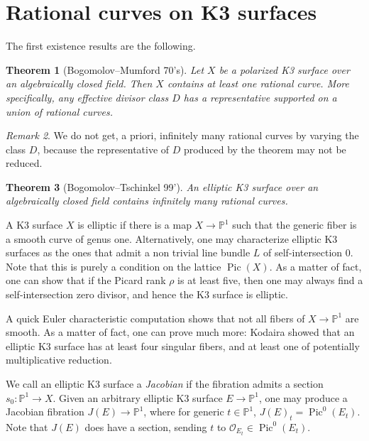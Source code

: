 \documentclass{amsart}
\theoremstyle{plain}
\newtheorem{theorem}{Theorem}[section]
\theoremstyle{definition}
\theoremstyle{remark}
\newtheorem{remark}[theorem]{Remark}
\DeclareMathOperator{\Pic}{Pic}
\begin{document}
\section{Rational curves on K3 surfaces} %
\label{sec:rational_curves_on_k3_surfaces}

The first existence results are the following.
\begin{theorem}[Bogomolov--Mumford 70's]
\label{theorem:bogomolov-mumford}
Let $X$ be a polarized K3 surface over an algebraically closed field.
Then $X$ contains at least one rational curve.
 More specifically, any effective divisor class $D$ has a representative supported on a union of
 rational curves. 
\end{theorem}
\begin{remark}
We do not get, a priori, infinitely many rational curves by varying the class $D$, 
because the representative of $D$ produced by the theorem may not be reduced.
\end{remark}

\begin{theorem}[Bogomolov--Tschinkel 99']
\label{theorem:bogomolov-tschinkel}
An elliptic K3 surface over an algebraically closed field contains infinitely many rational curves.
\end{theorem}

A K3 surface $X$ is elliptic if there is a map $X \to \mathbb{P}^1$ such that the generic
fiber is a smooth curve of genus one. Alternatively, one may characterize elliptic K3 surfaces as the ones that admit a non trivial line bundle $L$ of self-intersection $0$. Note that this is purely a condition on
the lattice $\Pic(X)$. As a matter of fact, one can show that if the Picard rank $\rho$ is at least five, then one may always find a self-intersection zero divisor, and hence the K3 surface is elliptic.

A quick Euler characteristic computation shows that not all fibers of $X \to \mathbb{P}^1$ are smooth.
As a matter of fact, one can prove much more: Kodaira showed that an elliptic K3 surface has at least
four singular fibers, and at least one of potentially multiplicative reduction.

We call an elliptic K3 surface a \emph{Jacobian} if
the fibration admits a section $s_0:\mathbb{P}^1 \to X$. Given an arbitrary elliptic
K3 surface $E \to \mathbb{P}^1$, one may produce a Jacobian fibration $J(E) \to \mathbb{P}^1$,
where for generic $t \in \mathbb{P}^1$,
$J(E)_t = \Pic^0(E_t)$. Note that $J(E)$ does have a section, sending $t$ to $\mathcal{O}_{E_t} \in \Pic^0(E_t)$.
\end{document}
